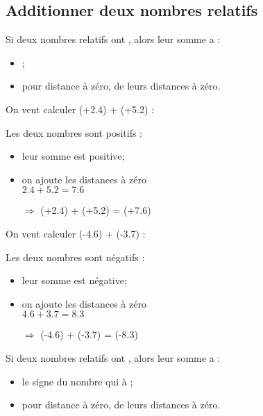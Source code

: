 \subsection{Additionner deux nombres relatifs}

\begin{myprop}
	Si deux nombres relatifs ont , alors leur somme a :
	\begin{itemize}
		\item {};
		\item pour distance à zéro,  de leurs distances à zéro.
	\end{itemize}
\end{myprop}

\begin{myexs}
	\begin{multicols}{2}
		On veut calculer (+\num{2.4}) + (+\num{5.2}) :
		
		Les deux nombres sont positifs :
		\begin{itemize}
			\item leur somme est positive;
			\item on ajoute les distances à zéro \\ $\num{2.4} + \num{5.2} = \num{7.6}$
			\item[$\Rightarrow$] (+\num{2.4}) + (+\num{5.2}) = (+\num{7.6})
		\end{itemize} 
		
		
		On veut calculer (-\num{4.6}) + (-\num{3.7}) :
		
		Les deux nombres sont négatifs :
		\begin{itemize}
			\item leur somme est négative;
			\item on ajoute les distances à zéro \\ $\num{4.6} + \num{3.7} = \num{8.3}$
			\item[$\Rightarrow$] (-\num{4.6}) + (-\num{3.7}) = (-\num{8.3})
		\end{itemize} 
	\end{multicols}
\end{myexs}

\begin{myprop}
	Si deux nombres relatifs ont , alors leur somme a :
	\begin{itemize}
		\item le signe du nombre qui à ;
		\item pour distance à zéro,  de leurs distances à zéro.
	\end{itemize}
\end{myprop}

